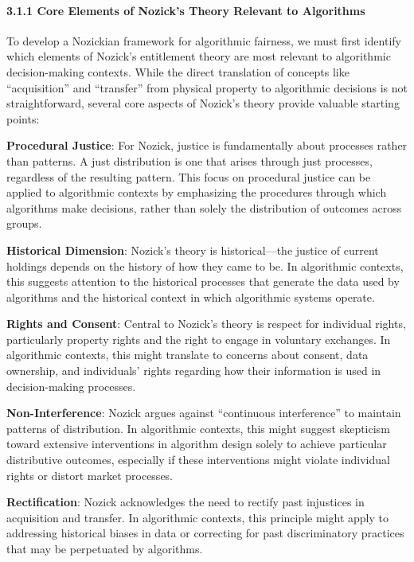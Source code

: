 \paragraph{3.1.1 Core Elements of Nozick's Theory Relevant to
Algorithms}\label{core-elements-of-nozicks-theory-relevant-to-algorithms}

To develop a Nozickian framework for algorithmic fairness, we must first
identify which elements of Nozick's entitlement theory are most relevant
to algorithmic decision-making contexts. While the direct translation of
concepts like ``acquisition'' and ``transfer'' from physical property to
algorithmic decisions is not straightforward, several core aspects of
Nozick's theory provide valuable starting points:

\textbf{Procedural Justice}: For Nozick, justice is fundamentally about
processes rather than patterns. A just distribution is one that arises
through just processes, regardless of the resulting pattern. This focus
on procedural justice can be applied to algorithmic contexts by
emphasizing the procedures through which algorithms make decisions,
rather than solely the distribution of outcomes across groups.

\textbf{Historical Dimension}: Nozick's theory is historical---the
justice of current holdings depends on the history of how they came to
be. In algorithmic contexts, this suggests attention to the historical
processes that generate the data used by algorithms and the historical
context in which algorithmic systems operate.

\textbf{Rights and Consent}: Central to Nozick's theory is respect for
individual rights, particularly property rights and the right to engage
in voluntary exchanges. In algorithmic contexts, this might translate to
concerns about consent, data ownership, and individuals' rights
regarding how their information is used in decision-making processes.

\textbf{Non-Interference}: Nozick argues against ``continuous
interference'' to maintain patterns of distribution. In algorithmic
contexts, this might suggest skepticism toward extensive interventions
in algorithm design solely to achieve particular distributive outcomes,
especially if these interventions might violate individual rights or
distort market processes.

\textbf{Rectification}: Nozick acknowledges the need to rectify past
injustices in acquisition and transfer. In algorithmic contexts, this
principle might apply to addressing historical biases in data or
correcting for past discriminatory practices that may be perpetuated by
algorithms.

